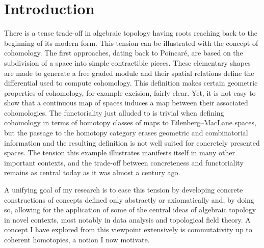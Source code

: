 
\section*{Introduction} \label{s:introduction}

There is a tense trade-off in algebraic topology having roots reaching back to the beginning of its modern form.
This tension can be illustrated with the concept of cohomology.
The first approaches, dating back to Poincar\'e, are based on the subdivision of a space into simple contractible pieces.
These elementary shapes are made to generate a free graded module and their spatial relations define the differential used to compute cohomology.
This definition makes certain geometric properties of cohomology, for example excision, fairly clear.
Yet, it is not easy to show that a continuous map of spaces induces a map between their associated cohomologies.
The functoriality just alluded to is trivial when defining cohomology in terms of homotopy classes of maps to Eilenberg--MacLane spaces, but the passage to the homotopy category erases geometric and combinatorial information and the resulting definition is not well suited for concretely presented spaces.
The tension this example illustrates manifests itself in many other important contexts, and the trade-off between concreteness and functoriality remains as central today as it was almost a century ago.

A unifying goal of my research is to ease this tension by developing concrete constructions of concepts defined only abstractly or axiomatically and, by doing so, allowing for the application of some of the central ideas of algebraic topology in novel contexts, most notably in data analysis and topological field theory.
A concept I have explored from this viewpoint extensively is commutativity up to coherent homotopies, a notion I now motivate.

